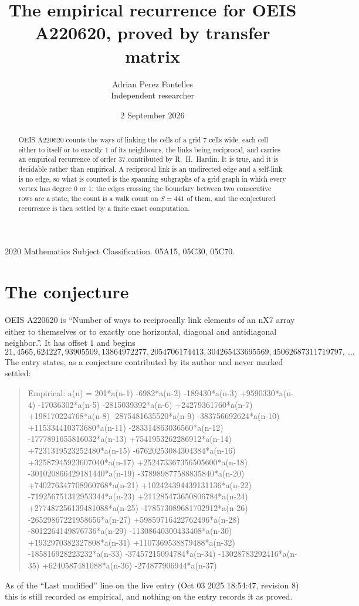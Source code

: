 \documentclass[11pt,a4paper]{article}
\title{The empirical recurrence for OEIS A220620, proved by transfer matrix}
\author{Adrian Perez Fontelles\\ \small Independent researcher}
\date{2 September 2026}
\theoremstyle{plain}
\theoremstyle{definition}
\begin{document}
\maketitle

\begin{abstract}
OEIS A220620 counts the ways of linking the cells of a grid $7$ cells wide, each cell either to
itself or to exactly $1$ of its neighbours, the links being reciprocal, and carries an
empirical recurrence of order $37$ contributed by R.~H.~Hardin. It is true, and it is
decidable rather than empirical. A reciprocal link is an undirected edge and a self-link is
no edge, so what is counted is the spanning subgraphs of a grid graph in which every vertex
has degree $0$ or $1$; the edges crossing the boundary between two consecutive rows are a
state, the count is a walk count on $S=441$ of them, and the conjectured recurrence is then
settled by a finite exact computation.
\end{abstract}

\noindent\small 2020 Mathematics Subject Classification. 05A15, 05C30, 05C70.\normalsize

\section{The conjecture}

OEIS A220620 is ``Number of ways to reciprocally link elements of an nX7 array either to themselves or to exactly one horizontal, diagonal and antidiagonal neighbor.''. It has offset $1$ and begins
\[
21, 4565, 624227, 93905509, 13864972277, 2054706174413, 304265433695569, 45062687311719797,\ \dots
\]
The entry states, as a conjecture contributed by its author and never marked settled:
\begin{quote}
Empirical: a(n) = 201*a(n-1) -6982*a(n-2) -189430*a(n-3) +9590330*a(n-4) -17036302*a(n-5) -2815039392*a(n-6) +24279361760*a(n-7) +198170224768*a(n-8) -2875481635520*a(n-9) -383756692624*a(n-10) +115334410373680*a(n-11) -283314863036560*a(n-12) -1777891655816032*a(n-13) +7541953262286912*a(n-14) +7231319523252480*a(n-15) -67620253084304384*a(n-16) +32587945923607040*a(n-17) +252473367356505600*a(n-18) -301020866429181440*a(n-19) -378989877588835840*a(n-20) +740276347708960768*a(n-21) +102424394439131136*a(n-22) -719256751312953344*a(n-23) +211285473650806784*a(n-24) +277487256139481088*a(n-25) -178573089681702912*a(n-26) -26529867221958656*a(n-27) +59859716422762496*a(n-28) -8012264149876736*a(n-29) -11308640300433408*a(n-30) +1932970382327808*a(n-31) +1107369538879488*a(n-32) -185816928223232*a(n-33) -37457215094784*a(n-34) -13028783292416*a(n-35) +6240587481088*a(n-36) -274877906944*a(n-37)
\end{quote}
As of the ``Last modified'' line on the live entry (Oct 03 2025 18:54:47, revision 8) this is still
recorded as empirical, and nothing on the entry records it as proved.
\end{document}
